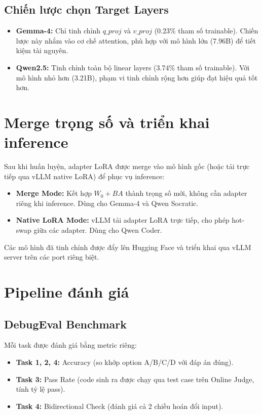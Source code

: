 \subsection{Chiến lược chọn Target Layers}

\begin{itemize}
    \item \textbf{Gemma-4:} Chỉ tinh chỉnh $q\_proj$ và $v\_proj$ (0.23\% tham số trainable). Chiến lược này nhắm vào cơ chế attention, phù hợp với mô hình lớn (7.96B) để tiết kiệm tài nguyên.
    \item \textbf{Qwen2.5:} Tinh chỉnh toàn bộ linear layers (3.74\% tham số trainable). Với mô hình nhỏ hơn (3.21B), phạm vi tinh chỉnh rộng hơn giúp đạt hiệu quả tốt hơn.
\end{itemize}

\section{Merge trọng số và triển khai inference}

Sau khi huấn luyện, adapter LoRA được merge vào mô hình gốc (hoặc tải trực tiếp qua vLLM native LoRA) để phục vụ inference:

\begin{itemize}
    \item \textbf{Merge Mode:} Kết hợp $W_0 + BA$ thành trọng số mới, không cần adapter riêng khi inference. Dùng cho Gemma-4 và Qwen Socratic.
    \item \textbf{Native LoRA Mode:} vLLM tải adapter LoRA trực tiếp, cho phép hot-swap giữa các adapter. Dùng cho Qwen Coder.
\end{itemize}

Các mô hình đã tinh chỉnh được đẩy lên Hugging Face và triển khai qua vLLM server trên các port riêng biệt.

\section{Pipeline đánh giá}

\subsection{DebugEval Benchmark}

Mỗi task được đánh giá bằng metric riêng:

\begin{itemize}
    \item \textbf{Task 1, 2, 4:} Accuracy (so khớp option A/B/C/D với đáp án đúng).
    \item \textbf{Task 3:} Pass Rate (code sinh ra được chạy qua test case trên Online Judge, tính tỷ lệ pass).
    \item \textbf{Task 4:} Bidirectional Check (đánh giá cả 2 chiều hoán đổi input).
\end{itemize}

